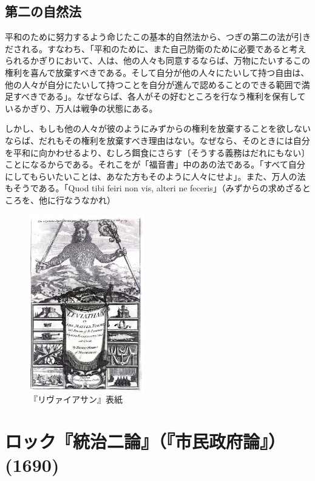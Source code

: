 \subsection{第二の自然法}



平和のために努力するよう命じたこの基本的自然法から、つぎの第二の法が引きだされる。すなわち、「平和のために、また自己防衛のために必要であると考えられるかぎりにおいて、人は、他の人々も同意するならば、万物にたいするこの権利を喜んで放棄すべきである。そして自分が他の人々にたいして持つ自由は、他の人々が自分にたいして持つことを自分が進んで認めることのできる範囲で満足すべきである」。なぜならば、各人がその好むところを行なう権利を保有しているかぎり、万人は戦争の状態にある。

しかし、もしも他の人々が彼のようにみずからの権利を放棄することを欲しないならば、だれもその権利を放棄すべき理由はない。なぜなら、そのときには自分を平和に向かわせるより、むしろ餌食にさらす〔そうする義務はだれにもない〕ことになるからである。それこをが「福音書」中のあの法である。「すべて自分にしてもらいたいことは、あなた方もそのように人々にせよ」。また、万人の法もそうである。「Quod tibi feiri non vis, alteri ne feceris」（みずからの求めざるところを、他に行なうなかれ）


  \begin{figure}[htbp]
    \centering
      \includegraphics[width=50mm]{images/leviathan.jpg}
    \caption{『リヴァイアサン』表紙}
  \end{figure}



\newpage{}






\section{ロック『統治二論』（『市民政府論』）(1690)}


